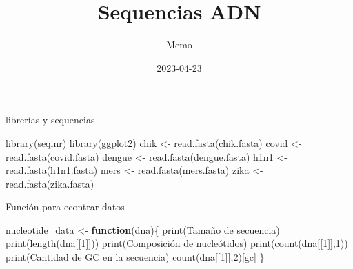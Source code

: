 \documentclass[
]{article}
\title{Sequencias ADN}
\author{Memo}
\date{2023-04-23}
\newenvironment{Shaded}{\begin{snugshade}}{\end{snugshade}}
\newcommand{\ControlFlowTok}[1]{\textcolor[rgb]{0.13,0.29,0.53}{\textbf{#1}}}
\newcommand{\DecValTok}[1]{\textcolor[rgb]{0.00,0.00,0.81}{#1}}
\newcommand{\FunctionTok}[1]{\textcolor[rgb]{0.00,0.00,0.00}{#1}}
\newcommand{\NormalTok}[1]{#1}
\newcommand{\OtherTok}[1]{\textcolor[rgb]{0.56,0.35,0.01}{#1}}
\newcommand{\StringTok}[1]{\textcolor[rgb]{0.31,0.60,0.02}{#1}}
\begin{document}
\maketitle

librerías y sequencias

\begin{Shaded}
\begin{Highlighting}[]
\FunctionTok{library}\NormalTok{(}\StringTok{\textquotesingle{}seqinr\textquotesingle{}}\NormalTok{)}
\FunctionTok{library}\NormalTok{(}\StringTok{\textquotesingle{}ggplot2\textquotesingle{}}\NormalTok{)}
\NormalTok{chik }\OtherTok{\textless{}{-}} \FunctionTok{read.fasta}\NormalTok{(}\StringTok{\textquotesingle{}chik.fasta\textquotesingle{}}\NormalTok{)}
\NormalTok{covid }\OtherTok{\textless{}{-}} \FunctionTok{read.fasta}\NormalTok{(}\StringTok{\textquotesingle{}covid.fasta\textquotesingle{}}\NormalTok{)}
\NormalTok{dengue }\OtherTok{\textless{}{-}} \FunctionTok{read.fasta}\NormalTok{(}\StringTok{\textquotesingle{}dengue.fasta\textquotesingle{}}\NormalTok{)}
\NormalTok{h1n1 }\OtherTok{\textless{}{-}} \FunctionTok{read.fasta}\NormalTok{(}\StringTok{\textquotesingle{}h1n1.fasta\textquotesingle{}}\NormalTok{)}
\NormalTok{mers }\OtherTok{\textless{}{-}} \FunctionTok{read.fasta}\NormalTok{(}\StringTok{\textquotesingle{}mers.fasta\textquotesingle{}}\NormalTok{)}
\NormalTok{zika }\OtherTok{\textless{}{-}} \FunctionTok{read.fasta}\NormalTok{(}\StringTok{\textquotesingle{}zika.fasta\textquotesingle{}}\NormalTok{)}
\end{Highlighting}
\end{Shaded}

Función para econtrar datos

\begin{Shaded}
\begin{Highlighting}[]
\NormalTok{nucleotide\_data }\OtherTok{\textless{}{-}} \ControlFlowTok{function}\NormalTok{(dna)\{}
  \FunctionTok{print}\NormalTok{(}\StringTok{\textquotesingle{}Tamaño de secuencia\textquotesingle{}}\NormalTok{)}
  \FunctionTok{print}\NormalTok{(}\FunctionTok{length}\NormalTok{(dna[[}\DecValTok{1}\NormalTok{]]))}
  \FunctionTok{print}\NormalTok{(}\StringTok{\textquotesingle{}Composición de nucleótidos\textquotesingle{}}\NormalTok{)}
  \FunctionTok{print}\NormalTok{(}\FunctionTok{count}\NormalTok{(dna[[}\DecValTok{1}\NormalTok{]],}\DecValTok{1}\NormalTok{))}
  \FunctionTok{print}\NormalTok{(}\StringTok{\textquotesingle{}Cantidad de GC en la secuencia\textquotesingle{}}\NormalTok{)}
  \FunctionTok{count}\NormalTok{(dna[[}\DecValTok{1}\NormalTok{]],}\DecValTok{2}\NormalTok{)[}\StringTok{\textquotesingle{}gc\textquotesingle{}}\NormalTok{]}
\NormalTok{\}}
\end{Highlighting}
\end{Shaded}
\end{document}
